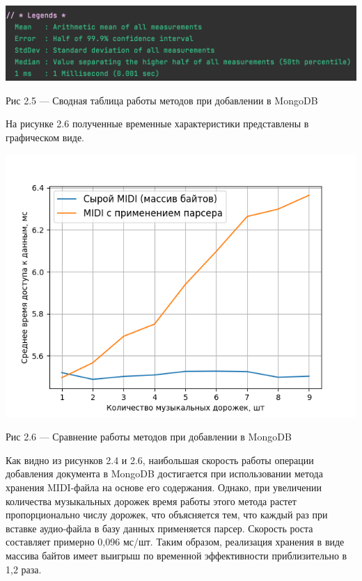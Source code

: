 \begin{center}
		\includegraphics[scale=0.6]{tex/img/Legends.png}
		
			Рис 2.5 — Сводная таблица работы методов при добавлении в MongoDB
\end{center}

На рисунке 2.6 полученные временные характеристики представлены в графическом виде.

\begin{center}
		\includegraphics[scale=0.7]{tex/img/figure_insert_query.png}
		
			Рис 2.6 — Сравнение работы методов при добавлении в MongoDB
\end{center}

Как видно из рисунков 2.4 и 2.6, наибольшая скорость работы операции добавления документа в MongoDB достигается при использовании метода хранения MIDI-файла на основе его содержания. Однако, при увеличении количества музыкальных дорожек время работы этого метода растет пропорционально числу дорожек, что объясняется тем, что каждый раз при вставке аудио-файла в базу данных применяется парсер. Скорость роста составляет примерно 0,096 мс/шт. Таким образом, реализация хранения в виде массива байтов имеет выигрыш по временной эффективности приблизительно в 1,2 раза.

